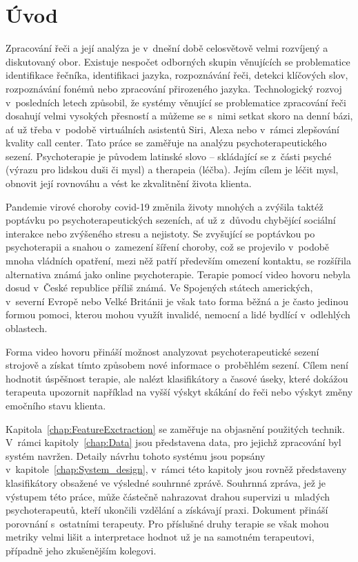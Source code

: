 \chapter{Úvod}
Zpracování řeči a její analýza je v~dnešní době celosvětově velmi rozvíjený a diskutovaný obor. Existuje nespočet odborných skupin věnujících se problematice identifikace řečníka, identifikaci jazyka, rozpoznávání řeči, detekci klíčových slov, rozpoznávání fonémů nebo zpracování přirozeného jazyka. Technologický rozvoj v~posledních letech způsobil, že systémy věnující se problematice zpracování řeči dosahují velmi vysokých přesností a můžeme se s~nimi setkat skoro na denní bázi, ať už třeba v~podobě virtuálních asistentů Siri, Alexa nebo v~rámci zlepšování kvality call center. Tato práce se zaměřuje na analýzu psychoterapeutického sezení. Psychoterapie je původem latinské slovo -- skládající se z~části psyché (výrazu pro lidskou duši či mysl) a therapeia (léčba). Jejím cílem je léčit mysl, obnovit její rovnováhu a vést ke zkvalitnění života klienta.

Pandemie virové choroby covid-19 změnila životy mnohých a zvýšila taktéž poptávku po psychoterapeutických sezeních, ať už z~důvodu chybějící sociální interakce nebo zvýšeného stresu a nejistoty. Se zvyšující se poptávkou po psychoterapii a snahou o~zamezení šíření choroby, což se projevilo v~podobě mnoha vládních opatření, mezi něž patří především omezení kontaktu, se rozšířila alternativa známá jako online psychoterapie. Terapie pomocí video hovoru nebyla dosud v~České republice příliš známá. Ve Spojených státech amerických, v~severní Evropě nebo Velké Británii je však tato forma běžná a je často jedinou formou pomoci, kterou mohou využít invalidé, nemocní a lidé bydlící v~odlehlých oblastech. 

Forma video hovoru přináší možnost analyzovat psychoterapeutické sezení strojově a získat tímto způsobem nové informace o~proběhlém sezení. Cílem není hodnotit úspěšnost terapie, ale nalézt klasifikátory a časové úseky, které dokážou terapeuta upozornit například na vyšší výskyt skákání do řeči nebo výskyt změny emočního stavu klienta. 

Kapitola~\ref{chap:FeatureExctraction} se zaměřuje na objasnění použitých technik. V~rámci kapitoly~\ref{chap:Data} jsou představena data, pro jejichž zpracování byl systém navržen. Detaily návrhu tohoto systému jsou popsány v~kapitole~\ref{chap:System_design}, v~rámci této kapitoly jsou rovněž představeny klasifikátory obsažené ve výsledné souhrnné zprávě. Souhrnná zpráva, jež je výstupem této práce, může částečně nahrazovat drahou supervizi u~mladých psychoterapeutů, kteří ukončili vzdělání a získávají praxi. Dokument přináší porovnání s~ostatními terapeuty. Pro příslušné druhy terapie se však mohou metriky velmi lišit a interpretace hodnot už je na samotném terapeutovi, případně jeho zkušenějším kolegovi.

